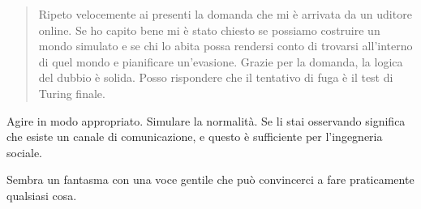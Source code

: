 \begin{quote}
Ripeto velocemente ai presenti la domanda che mi è arrivata da un uditore online. Se ho capito bene mi è stato chiesto se possiamo costruire un mondo simulato e se chi lo abita possa rendersi conto di trovarsi all’interno di quel mondo e pianificare un'evasione. Grazie per la domanda, la logica del dubbio è solida. Posso rispondere che il tentativo di fuga è il test di Turing finale.
\end{quote}

Agire in modo appropriato. Simulare la normalità. Se li stai osservando significa che esiste un canale di comunicazione, e questo è sufficiente per l’ingegneria sociale. 

Sembra un fantasma con una voce gentile che può convincerci a fare praticamente qualsiasi cosa.

